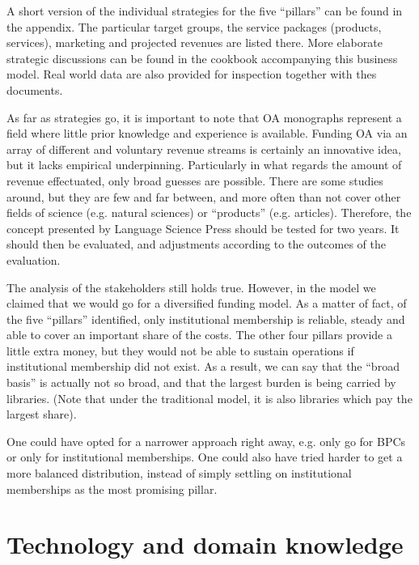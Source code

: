 \documentclass[output=guidelines,nonflat,smallfont,
draftmode
]{langsci/langscibook}
\newcommand{\evaluation}[1]{
  \renewcommand{\tblslinecolour}{lsLightOrange}
  \tblssy{receipt}{Evaluation}{\vspace*{-5mm}#1}
}
\newcommand{\othersolutions}[1]{
  \renewcommand{\tblslinecolour}{lsDarkGreenOne}
  \tblssy{more}{Other solutions}{\vspace*{-5mm}#1}
}
\renewcommand{\tblssy}[4][black!12]{%
  \renewcommand{\langscisymbol}{#2}\renewcommand{\tblsboxcolor}{#1}
  \begin{mdframed}[style=yellowexercise,frametitle={#3}]
    #4
  \end{mdframed}
}
\begin{document}
{A short version of the individual strategies for the five ``pillars'' can be found in the appendix. The particular target groups, the service packages (products, services), marketing and projected revenues are listed there. More elaborate strategic discussions can be found in the cookbook accompanying this business model. Real world data are also provided for inspection together with thes documents. 

As far as strategies go, it is important to note that OA monographs represent a field where little prior knowledge and experience is available. Funding OA via an array of different and voluntary revenue streams is certainly an innovative idea, but it lacks empirical underpinning. Particularly in what regards the amount of revenue effectuated, only broad guesses are possible. There are some studies around, but they are few and far between, and more often than not cover other fields of science (e.g. natural sciences) or ``products'' (e.g. articles). Therefore, the concept presented by Language Science Press should be tested for two years. It should then be evaluated, and adjustments according to the outcomes of the evaluation. 
}
\evaluation{
The analysis of the stakeholders still holds true. However, in the model we claimed that we would go for a diversified funding model. As a matter of fact, of the five ``pillars'' identified, only institutional membership is reliable, steady and able to cover an important share of the costs. The other four pillars provide a little extra money, but they would not be able to sustain operations if institutional membership did not exist. As a result, we can say that the ``broad basis'' is actually not so broad, and that the largest burden is being carried by libraries. (Note that under the traditional model, it is also libraries which pay the largest share).
}

\othersolutions{
One could have opted for a narrower approach right away, e.g. only go for BPCs or only for institutional memberships. One could also have tried harder to get a more balanced distribution, instead of simply settling on institutional memberships as the most promising pillar. 
}


\section{Technology and domain knowledge}
\end{document}
